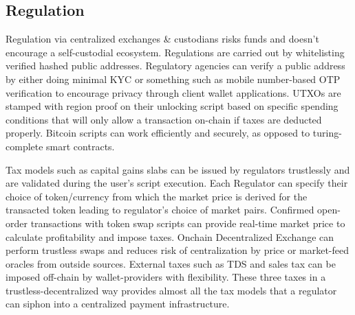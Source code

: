 \documentclass[../Bitcoin Blink.tex]{subfiles}
\begin{document}
\subsection{Regulation}
Regulation via centralized exchanges \& custodians risks funds and doesn't encourage a self-custodial ecosystem. Regulations are carried out by whitelisting verified hashed public addresses. Regulatory agencies can verify a public address by either doing minimal KYC or something such as mobile number-based OTP verification to encourage privacy through client wallet applications. UTXOs are stamped with region proof on their unlocking script based on specific spending conditions that will only allow a transaction on-chain if taxes are deducted properly. Bitcoin scripts can work efficiently and securely, as opposed to turing-complete smart contracts. 

Tax models such as capital gains slabs can be issued by regulators trustlessly and are validated during the user's script execution. Each Regulator can specify their choice of token/currency from which the market price is derived for the transacted token leading to regulator's choice of market pairs. Confirmed open-order transactions with token swap scripts can provide real-time market price to calculate profitability and impose taxes. Onchain Decentralized Exchange can perform trustless swaps and reduces risk of centralization by price or market-feed oracles from outside sources. External taxes such as TDS and sales tax can be imposed off-chain by wallet-providers with flexibility. These three taxes in a trustless-decentralized way provides almost all the tax models that a regulator can siphon into a centralized payment infrastructure.
\end{document}
